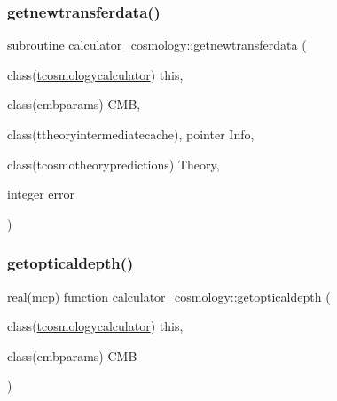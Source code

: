 \mbox{\label{namespacecalculator__cosmology_a96e555c628aadff1d707242e238d09f8}} 
\subsubsection{\texorpdfstring{getnewtransferdata()}{getnewtransferdata()}}
{\footnotesize\ttfamily subroutine calculator\+\_\+cosmology\+::getnewtransferdata (\begin{DoxyParamCaption}\item[{class(\mbox{\hyperlink{structcalculator__cosmology_1_1tcosmologycalculator}{tcosmologycalculator}})}]{this,  }\item[{class(cmbparams)}]{C\+MB,  }\item[{class(ttheoryintermediatecache), pointer}]{Info,  }\item[{class(tcosmotheorypredictions)}]{Theory,  }\item[{integer}]{error }\end{DoxyParamCaption})\hspace{0.3cm}{\ttfamily [private]}}

\mbox{\label{namespacecalculator__cosmology_a9907b8c61d20213e8026443a5043530f}} 
\subsubsection{\texorpdfstring{getopticaldepth()}{getopticaldepth()}}
{\footnotesize\ttfamily real(mcp) function calculator\+\_\+cosmology\+::getopticaldepth (\begin{DoxyParamCaption}\item[{class(\mbox{\hyperlink{structcalculator__cosmology_1_1tcosmologycalculator}{tcosmologycalculator}})}]{this,  }\item[{class(cmbparams)}]{C\+MB }\end{DoxyParamCaption})\hspace{0.3cm}{\ttfamily [private]}}

\mbox{\label{namespacecalculator__cosmology_a98a6aa3eeac24c242c935e0740b470d8}} 
